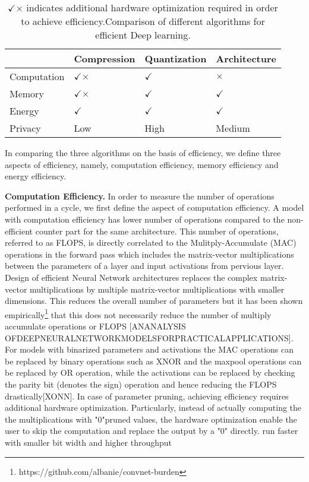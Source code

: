 \begin{table}[!htb]
\begin{center}
\renewcommand\arraystretch{1.5}
\fontsize{6.7pt}{6.7pt}\selectfont
\begin{tabular}{|l|l|l|l|}
\hline
 & Compression & Quantization & Architecture  \\
\hline
Computation & $\checkmark$$\times$  & $\checkmark$   & $\times$ \\
\hline
Memory &  $\checkmark$$\times$ & $\checkmark$   & $\checkmark$ \\
\hline
Energy &  $\checkmark$   & $\checkmark$   & $\checkmark$ \\
\hline
Privacy &  Low   & High   & Medium \\
\hline
\end{tabular}
\end{center}
\caption{$\checkmark$$\times$ indicates additional hardware optimization required in order to achieve efficiency.Comparison of different algorithms for efficient Deep learning.}
\label{tbl:comparison}
\end{table}


In comparing the three algorithms on the basis of efficiency, we define three aspects of efficiency, namely, computation efficiency, memory efficiency and energy efficiency.

\noindent\textbf{Computation Efficiency.} In order to measure the number of operations performed in a cycle, we first define the aspect of computation efficiency.
A model with computation efficiency has lower number of operations compared to the non-efficient counter part for the same architecture.
This number of operations, referred to as FLOPS, is directly correlated to the Mulitply-Accumulate (MAC) operations in the forward pass which includes the matrix-vector multiplications between the parameters of a layer and input activations from pervious layer.
Design of efficient Neural Network architectures replaces the complex matrix-vector multiplications by multiple matrix-vector multiplications with smaller dimensions.
This reduces the overall number of parameters but it has been shown empirically\footnote{https://github.com/albanie/convnet-burden} that this does not necessarily reduce the number of multiply accumulate operations or FLOPS [ANANALYSIS  OFDEEPNEURALNETWORKMODELSFORPRACTICALAPPLICATIONS].
For models with binarized parameters and activations the MAC operations can be replaced by binary operations such as XNOR and the maxpool operations can be replaced by OR operation, while the activations can be replaced by checking the parity bit (denotes the sign) operation and hence reducing the FLOPS drastically[XONN].
In case of parameter pruning, achieving efficiency requires additional hardware optimization. Particularly, instead of actually computing the the multiplications with "0"pruned values, the hardware optimization enable the user to skip the computation and replace the output by a "0" directly.
run faster with smaller bit width and higher throughput

